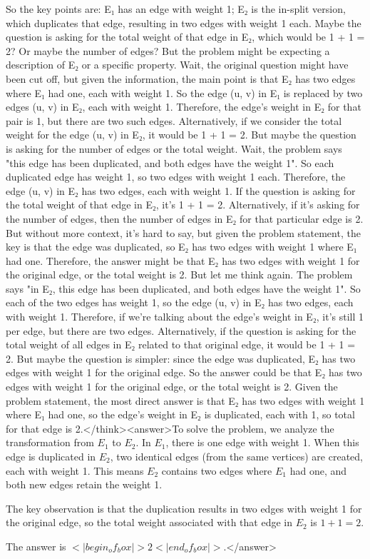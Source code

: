 So the key points are: E₁ has an edge with weight 1; E₂ is the in-split version, which duplicates that edge, resulting in two edges with weight 1 each. Maybe the question is asking for the total weight of that edge in E₂, which would be 1 + 1 = 2? Or maybe the number of edges? But the problem might be expecting a description of E₂ or a specific property. Wait, the original question might have been cut off, but given the information, the main point is that E₂ has two edges where E₁ had one, each with weight 1. So the edge (u, v) in E₁ is replaced by two edges (u, v) in E₂, each with weight 1. Therefore, the edge's weight in E₂ for that pair is 1, but there are two such edges. Alternatively, if we consider the total weight for the edge (u, v) in E₂, it would be 1 + 1 = 2. But maybe the question is asking for the number of edges or the total weight. Wait, the problem says "this edge has been duplicated, and both edges have the weight 1". So each duplicated edge has weight 1, so two edges with weight 1 each. Therefore, the edge (u, v) in E₂ has two edges, each with weight 1. If the question is asking for the total weight of that edge in E₂, it's 1 + 1 = 2. Alternatively, if it's asking for the number of edges, then the number of edges in E₂ for that particular edge is 2. But without more context, it's hard to say, but given the problem statement, the key is that the edge was duplicated, so E₂ has two edges with weight 1 where E₁ had one. Therefore, the answer might be that E₂ has two edges with weight 1 for the original edge, or the total weight is 2. But let me think again. The problem says "in E₂, this edge has been duplicated, and both edges have the weight 1". So each of the two edges has weight 1, so the edge (u, v) in E₂ has two edges, each with weight 1. Therefore, if we're talking about the edge's weight in E₂, it's still 1 per edge, but there are two edges. Alternatively, if the question is asking for the total weight of all edges in E₂ related to that original edge, it would be 1 + 1 = 2. But maybe the question is simpler: since the edge was duplicated, E₂ has two edges with weight 1 for the original edge. So the answer could be that E₂ has two edges with weight 1 for the original edge, or the total weight is 2. Given the problem statement, the most direct answer is that E₂ has two edges with weight 1 where E₁ had one, so the edge's weight in E₂ is duplicated, each with 1, so total for that edge is 2.</think><answer>To solve the problem, we analyze the transformation from \( E_1 \) to \( E_2 \). In \( E_1 \), there is one edge with weight 1. When this edge is duplicated in \( E_2 \), two identical edges (from the same vertices) are created, each with weight 1. This means \( E_2 \) contains two edges where \( E_1 \) had one, and both new edges retain the weight 1.  

The key observation is that the duplication results in two edges with weight 1 for the original edge, so the total weight associated with that edge in \( E_2 \) is \( 1 + 1 = 2 \).  

The answer is \(<|begin_of_box|>2<|end_of_box|>\).</answer>